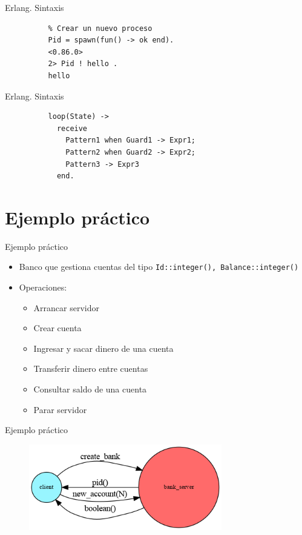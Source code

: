 \documentclass{beamer}
\begin{document}
      \begin{frame}[fragile]{Erlang. Sintaxis}
        \begin{verbatim}
          % Crear un nuevo proceso
          Pid = spawn(fun() -> ok end).
          <0.86.0>
          2> Pid ! hello .
          hello
        \end{verbatim}
      \end{frame}

      \begin{frame}[fragile]{Erlang. Sintaxis}
        \begin{verbatim}
          loop(State) ->
            receive
              Pattern1 when Guard1 -> Expr1;
              Pattern2 when Guard2 -> Expr2;
              Pattern3 -> Expr3
            end.
        \end{verbatim}
      \end{frame}

  \section{Ejemplo práctico}
    \begin{frame}{Ejemplo práctico}
      \begin{itemize}
        \item Banco que gestiona cuentas del tipo \texttt{{Id::integer(), Balance::integer()}}
        \item Operaciones:
        \begin{itemize}
          \item Arrancar servidor
          \item Crear cuenta
          \item Ingresar y sacar dinero de una cuenta
          \item Transferir dinero entre cuentas
          \item Consultar saldo de una cuenta
          \item Parar servidor
        \end{itemize}
      \end{itemize}
    \end{frame}

    \begin{frame}{Ejemplo práctico}
      \begin{figure}
        \includegraphics[width=0.75\textwidth]{create_bank-new_account.dot.png}
      \end{figure}
    \end{frame}
\end{document}
